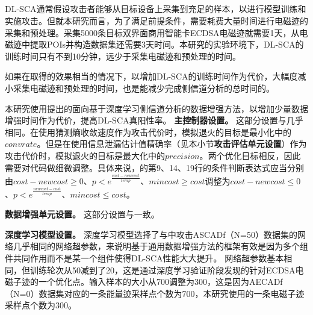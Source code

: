 {{	\subsection{\shujuzengqiang}\label{subs:useagmt}
	DL-SCA通常假设攻击者能够从目标设备上采集到充足的样本，以进行模型训练和实施攻击。但就本研究而言，为了满足前提条件，需要耗费大量时间进行电磁迹的采集和预处理。采集5000条目标双界面商用智能卡ECDSA电磁迹就需要1天，从电磁迹中提取POIs并构造数据集还需要3天时间。本研究的实验环境下，DL-SCA的训练时间只有不到10分钟，远少于采集电磁迹和预处理的时间。
	
	如果在取得的效果相当的情况下，以增加DL-SCA的训练时间作为代价，大幅度减小采集电磁迹和预处理的时间，也是能减少完成侧信道分析的总时间的。
	
	本研究使用提出的面向基于深度学习侧信道分析的数据增强方法，以增加少量数据增强时间作为代价，提高DL-SCA真阳性率。
	\textbf{主控制器设置。}
	这部分设置与几乎相同。在使用猜测熵收敛速度作为攻击代价时，模拟退火的目标是最小化中的$convrate$。但是在使用信息泄漏估计值精确率（见本小节\textbf{攻击评估单元设置}）作为攻击代价时，模拟退火的目标是最大化中的$precision$。两个优化目标相反，因此需要对代码做细微调整。具体来说，的第9、14、19行的条件判断表达式应当分别由$cost-newcost\ge0$、$p<e^{\frac{cost-newcost}{temp}}$、$mincost\ge cost$调整为$cost-newcost\le0$、$p<e^{\frac{newcost-cost}{temp}}$、$mincost\le cost$。
	
	\textbf{数据增强单元设置。}
	这部分设置与一致。
	
	\textbf{深度学习模型设置。}
	深度学习模型选择了与中攻击ASCADf（N=50）数据集的网络几乎相同的网络超参数，来说明基于通用数据增强方法的框架有效是因为多个组件共同作用而不是某一个组件使得DL-SCA性能大大提升。
	网络超参数基本相同，但训练轮次从50减到了20，这是通过深度学习验证阶段发现的针对ECDSA电磁子迹的一个优化点。输入样本的大小从700调整为300，这是因为AECADf（N=0）数据集对应的一条能量迹采样点个数为700，本研究使用的一条电磁子迹采样点个数为300。
	
	
}}
